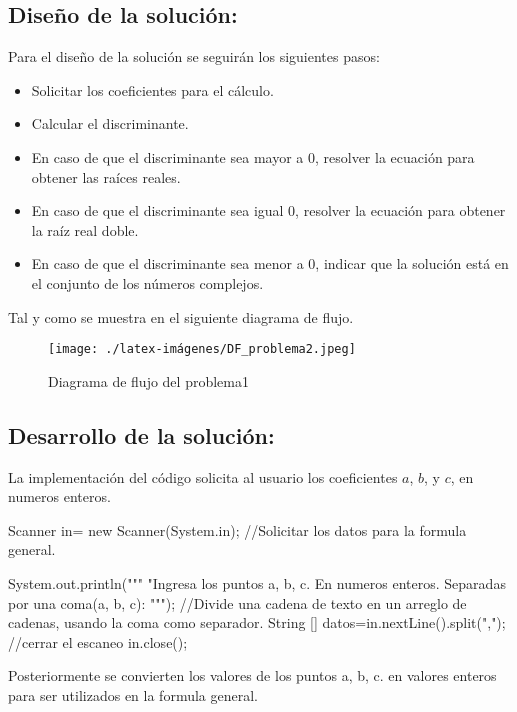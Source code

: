 \subsection{\textbf{Diseño de la solución:}}

Para el diseño de la solución se seguirán los siguientes pasos:
\begin{itemize}
    \item Solicitar los coeficientes para el cálculo.
    \item Calcular el discriminante.
    \item En caso de que el discriminante sea mayor a 0, resolver la ecuación para obtener las raíces reales.
    \item En caso de que el discriminante sea igual 0, resolver la ecuación para obtener la raíz real doble.
    \item En caso de que el discriminante sea menor a 0, indicar que la solución está en el conjunto de los números complejos.
\end{itemize}

Tal y como se muestra en el siguiente diagrama de flujo.

\begin{figure}[h!]
    \centering
    \texttt{[image: ./latex-imágenes/DF\_problema2.jpeg]}
    \caption{Diagrama de flujo del problema1}
    \label{fig:Diagramadeflujodel problema1}
\end{figure}

\subsection{\textbf{Desarrollo de la solución:}}
La implementación del código solicita al usuario los coeficientes \(a\), \(b\), y \(c\), en numeros enteros. 
\begin{javaCode}
 Scanner in= new Scanner(System.in);
        //Solicitar los datos para la formula general.
        
        System.out.println("""
                           "Ingresa los puntos a, b, c.
                           En numeros enteros.
                           Separadas por una coma(a, b, c): 
                           """);
        //Divide una cadena de texto en un arreglo de cadenas, usando la coma como separador.
        String [] datos=in.nextLine().split(",");
        //cerrar el escaneo
        in.close();
        
\end{javaCode}
Posteriormente se convierten los valores de los puntos a, b, c. en valores enteros para ser utilizados  en la formula general.

